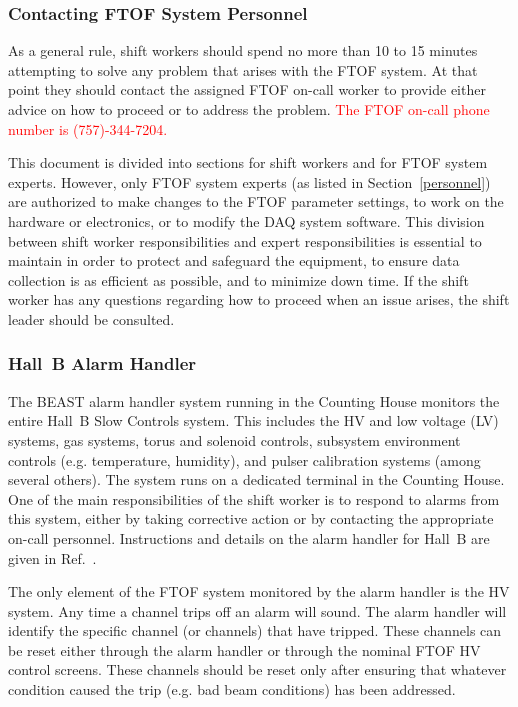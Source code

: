 \documentclass[12pt]{article}
\begin{document}
\subsubsection{Contacting FTOF System Personnel}
\label{contact}

As a general rule, shift workers should spend no more than 10 to 15 minutes attempting to 
solve any problem that arises with the FTOF system. At that point they should contact the 
assigned FTOF on-call worker to provide either advice on how to proceed or to address the 
problem. \textcolor{red}{The FTOF on-call phone number is (757)-344-7204.}

This document is divided into sections for shift workers and for FTOF system experts. 
However, only FTOF system experts (as listed in Section~\ref{personnel}) are authorized 
to make changes to the FTOF parameter settings, to work on the hardware or electronics, 
or to modify the DAQ system software. This division between shift worker responsibilities 
and expert responsibilities is essential to maintain in order to protect and safeguard 
the equipment, to ensure data collection is as efficient as possible, and to minimize 
down time. If the shift worker has any questions regarding how to proceed when an issue 
arises, the shift leader should be consulted.

\subsubsection{Hall~B Alarm Handler}
\label{alarms}

The BEAST alarm handler system running in the Counting House monitors the entire 
Hall~B Slow Controls system. This includes the HV and low voltage (LV) systems, gas 
systems, torus and solenoid controls, subsystem environment controls (e.g. temperature, 
humidity), and pulser calibration systems (among several others). The system runs on a 
dedicated terminal in the Counting House. One of the main responsibilities of the shift 
worker is to respond to alarms from this system, either by taking corrective action or 
by contacting the appropriate on-call personnel. Instructions and details on the alarm 
handler for Hall~B are given in Ref.~\cite{beast}.

The only element of the FTOF system monitored by the alarm handler is the HV system. 
Any time a channel trips off an alarm will sound. The alarm handler will identify the 
specific channel (or channels) that have tripped. These channels can be reset either 
through the alarm handler or through the nominal FTOF HV control screens. These channels 
should be reset only after ensuring that whatever condition caused the trip (e.g. bad 
beam conditions) has been addressed.
\end{document}
